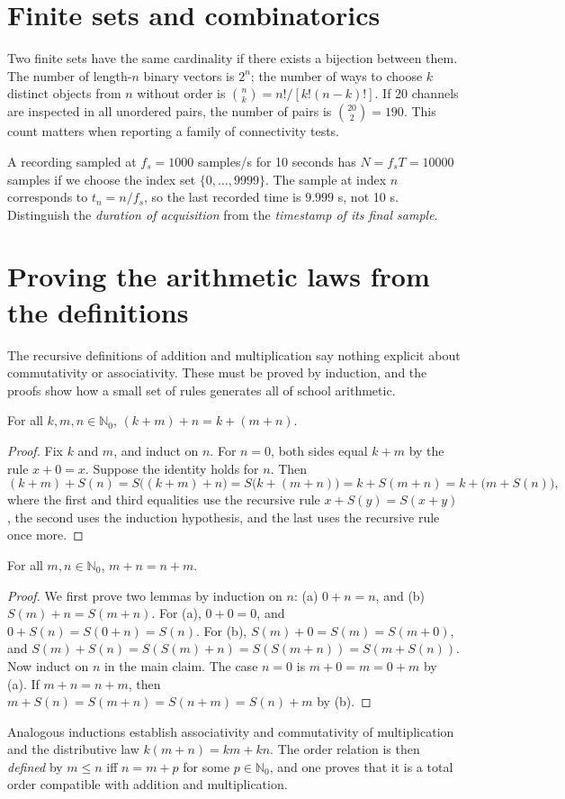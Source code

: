 \section{Finite sets and combinatorics}
Two finite sets have the same cardinality if there exists a bijection between them. The number of length-$n$ binary vectors is $2^n$; the number of ways to choose $k$ distinct objects from $n$ without order is $\binom nk=n!/[k!(n-k)!]$. If 20 channels are inspected in all unordered pairs, the number of pairs is $\binom{20}{2}=190$. This count matters when reporting a family of connectivity tests.

\begin{workedexample}
A recording sampled at $f_s=1000$ samples/s for 10 seconds has $N=f_sT=10000$ samples if we choose the index set $\{0,\ldots,9999\}$. The sample at index $n$ corresponds to $t_n=n/f_s$, so the last recorded time is $9.999$ s, not 10 s. Distinguish the \emph{duration of acquisition} from the \emph{timestamp of its final sample}.
\end{workedexample}
\section{Proving the arithmetic laws from the definitions}
The recursive definitions of addition and multiplication say nothing explicit about commutativity or associativity. These must be proved by induction, and the proofs show how a small set of rules generates all of school arithmetic.

\begin{proposition}
For all $k,m,n\in\mathbb N_0$, $(k+m)+n=k+(m+n)$.
\end{proposition}
\begin{proof}
Fix $k$ and $m$, and induct on $n$. For $n=0$, both sides equal $k+m$ by the rule $x+0=x$. Suppose the identity holds for $n$. Then
\[
(k+m)+S(n)=S\bigl((k+m)+n\bigr)=S\bigl(k+(m+n)\bigr)=k+S(m+n)=k+\bigl(m+S(n)\bigr),
\]
where the first and third equalities use the recursive rule $x+S(y)=S(x+y)$, the second uses the induction hypothesis, and the last uses the recursive rule once more.
\end{proof}

\begin{proposition}
For all $m,n\in\mathbb N_0$, $m+n=n+m$.
\end{proposition}
\begin{proof}
We first prove two lemmas by induction on $n$: (a) $0+n=n$, and (b) $S(m)+n=S(m+n)$. For (a), $0+0=0$, and $0+S(n)=S(0+n)=S(n)$. For (b), $S(m)+0=S(m)=S(m+0)$, and $S(m)+S(n)=S(S(m)+n)=S(S(m+n))=S(m+S(n))$. Now induct on $n$ in the main claim. The case $n=0$ is $m+0=m=0+m$ by (a). If $m+n=n+m$, then $m+S(n)=S(m+n)=S(n+m)=S(n)+m$ by (b).
\end{proof}
Analogous inductions establish associativity and commutativity of multiplication and the distributive law $k(m+n)=km+kn$. The order relation is then \emph{defined} by $m\le n$ iff $n=m+p$ for some $p\in\mathbb N_0$, and one proves that it is a total order compatible with addition and multiplication.

